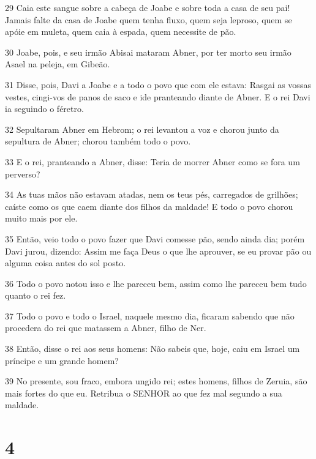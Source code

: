 \par 29 Caia este sangue sobre a cabeça de Joabe e sobre toda a casa de seu pai! Jamais falte da casa de Joabe quem tenha fluxo, quem seja leproso, quem se apóie em muleta, quem caia à espada, quem necessite de pão.
\par 30 Joabe, pois, e seu irmão Abisai mataram Abner, por ter morto seu irmão Asael na peleja, em Gibeão.
\par 31 Disse, pois, Davi a Joabe e a todo o povo que com ele estava: Rasgai as vossas vestes, cingi-vos de panos de saco e ide pranteando diante de Abner. E o rei Davi ia seguindo o féretro.
\par 32 Sepultaram Abner em Hebrom; o rei levantou a voz e chorou junto da sepultura de Abner; chorou também todo o povo.
\par 33 E o rei, pranteando a Abner, disse: Teria de morrer Abner como se fora um perverso?
\par 34 As tuas mãos não estavam atadas, nem os teus pés, carregados de grilhões; caíste como os que caem diante dos filhos da maldade! E todo o povo chorou muito mais por ele.
\par 35 Então, veio todo o povo fazer que Davi comesse pão, sendo ainda dia; porém Davi jurou, dizendo: Assim me faça Deus o que lhe aprouver, se eu provar pão ou alguma coisa antes do sol posto.
\par 36 Todo o povo notou isso e lhe pareceu bem, assim como lhe pareceu bem tudo quanto o rei fez.
\par 37 Todo o povo e todo o Israel, naquele mesmo dia, ficaram sabendo que não procedera do rei que matassem a Abner, filho de Ner.
\par 38 Então, disse o rei aos seus homens: Não sabeis que, hoje, caiu em Israel um príncipe e um grande homem?
\par 39 No presente, sou fraco, embora ungido rei; estes homens, filhos de Zeruia, são mais fortes do que eu. Retribua o SENHOR ao que fez mal segundo a sua maldade.

\chapter{4}

